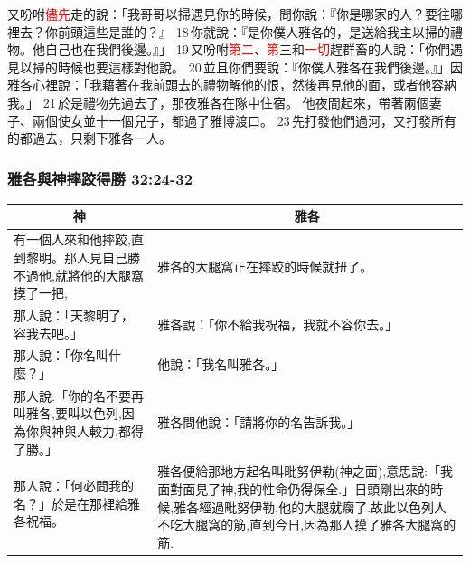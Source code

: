 又吩咐\textcolor{red}{儘先}走的說：「我哥哥以掃遇見你的時候，問你說：『你是哪家的人？要往哪裡去？你前頭這些是誰的？』 18 你就說：『是你僕人雅各的，是送給我主以掃的禮物。他自己也在我們後邊。』」 19 又吩咐\textcolor{red}{第二}、\textcolor{red}{第}三和\textcolor{red}{一切}趕群畜的人說：「你們遇見以掃的時候也要這樣對他說。 20 並且你們要說：『你僕人雅各在我們後邊。』」因雅各心裡說：「我藉著在我前頭去的禮物解他的恨，然後再見他的面，或者他容納我。」 21 於是禮物先過去了，那夜雅各在隊中住宿。
他夜間起來，帶著兩個妻子、兩個使女並十一個兒子，都過了雅博渡口。 23 先打發他們過河，又打發所有的都過去，只剩下雅各一人。


\subsubsection{雅各與神摔跤得勝 32:24-32 }
\begin{table}[H]
\centering
\begin{tabular}{p{6.250cm}|p{11.250cm}}\hline\hline
\multicolumn{1}{c|}{神}&\multicolumn{1}{c}{雅各}\\\hline
有一個人來和他摔跤,直到黎明。那人見自己勝不過他,就將他的大腿窩摸了一把,
&雅各的大腿窩正在摔跤的時候就扭了。\\\hline
那人說：「天黎明了，容我去吧。」&雅各說：「你不給我祝福，我就不容你去。」\\\hline
那人說：「你名叫什麼？」&他說：「我名叫雅各。」\\\hline
那人說:「你的名不要再叫雅各,要叫以色列,因為你與神與人較力,都得了勝。」&雅各問他說：「請將你的名告訴我。」\\\hline
那人說：「何必問我的名？」於是在那裡給雅各祝福。&\multirow{2}{11.5cm}{雅各便給那地方起名叫毗努伊勒(神之面),意思說:「我面對面見了神,我的性命仍得保全.」日頭剛出來的時候,雅各經過毗努伊勒,他的大腿就瘸了.故此以色列人不吃大腿窩的筋,直到今日,因為那人摸了雅各大腿窩的筋.}\\%
&\\\hline
\end{tabular}
\end{table}


